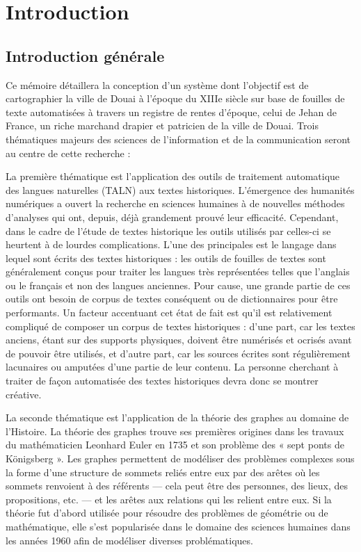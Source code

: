 \chapter{Introduction}
\section{Introduction générale}
 Ce mémoire détaillera la conception d’un système dont l’objectif est de cartographier la ville de Douai à l’époque du XIIIe siècle sur base de fouilles de texte automatisées à travers un registre de rentes d'époque, celui de Jehan de France, un riche marchand drapier et patricien de la ville de Douai. Trois thématiques majeurs des sciences de l'information et de la communication seront au centre de cette recherche :
 
 La première thématique est l’application des outils de traitement automatique des langues naturelles (TALN) aux textes historiques. L’émergence des humanités numériques a ouvert la recherche en sciences humaines à de nouvelles méthodes d’analyses qui ont, depuis, déjà grandement prouvé leur efficacité. Cependant, dans le cadre de l’étude de textes historique les outils utilisés par celles-ci se heurtent à de lourdes complications. L’une des principales est le langage dans lequel sont écrits des textes historiques : les outils de fouilles de textes sont généralement conçus pour traiter les langues très représentées telles que l’anglais ou le français et non des langues anciennes. Pour cause, une grande partie de ces outils ont besoin de corpus de textes conséquent ou de dictionnaires pour être performants. Un facteur accentuant cet état de fait est qu’il est relativement compliqué de composer un corpus de textes historiques : d’une part, car les textes anciens, étant sur des supports physiques, doivent être numérisés et ocrisés avant de pouvoir être utilisés, et d’autre part, car les sources écrites sont régulièrement lacunaires ou amputées d’une partie de leur contenu. La personne cherchant à traiter de façon automatisée des textes historiques devra donc se montrer créative.
 
La seconde thématique est l’application de la théorie des graphes au domaine de l’Histoire. La théorie des graphes trouve ses premières origines dans les travaux du mathématicien Leonhard Euler en 1735 et son problème des « sept ponts de Königsberg ». Les graphes permettent de modéliser des problèmes complexes sous la forme d’une structure de sommets reliés entre eux par des arêtes où les sommets renvoient à des référents — cela peut être des personnes, des lieux, des propositions, etc. — et les arêtes aux relations qui les relient entre eux. Si la théorie fut d’abord utilisée pour résoudre des problèmes de géométrie ou de mathématique, elle s’est popularisée dans le domaine des sciences humaines dans les années 1960 afin de modéliser diverses problématiques.

